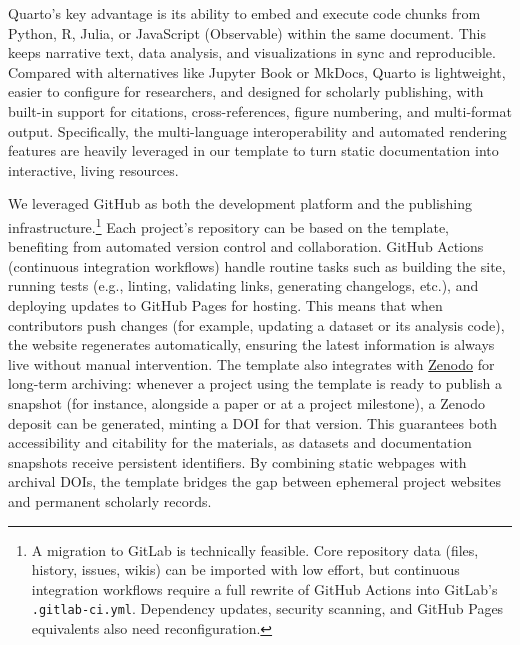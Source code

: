 \documentclass[final]{anthology-ch} %
\begin{document}
Quarto's key advantage is its ability to embed and execute code chunks from Python, R, Julia, or JavaScript (Observable) within the same document. This keeps narrative text, data analysis, and visualizations in sync and reproducible. Compared with alternatives like Jupyter Book or MkDocs, Quarto is lightweight, easier to configure for researchers, and designed for scholarly publishing, with built-in support for citations, cross-references, figure numbering, and multi-format output. Specifically, the multi-language interoperability and automated rendering features are heavily leveraged in our template to turn static documentation into interactive, living resources.

We leveraged GitHub as both the development platform and the publishing infrastructure.\footnote{A migration to GitLab is technically feasible. Core repository data (files, history, issues, wikis) can be imported with low effort, but continuous integration workflows require a full rewrite of GitHub Actions into GitLab's \texttt{.gitlab-ci.yml}. Dependency updates, security scanning, and GitHub Pages equivalents also need reconfiguration.} Each project's repository can be based on the template, benefiting from automated version control and collaboration. GitHub Actions (continuous integration workflows) handle routine tasks such as building the site, running tests (e.g., linting, validating links, generating changelogs, etc.), and deploying updates to GitHub Pages for hosting. This means that when contributors push changes (for example, updating a dataset or its analysis code), the website regenerates automatically, ensuring the latest information is always live without manual intervention. The template also integrates with \href{https://zenodo.org/}{Zenodo} for long-term archiving: whenever a project using the template is ready to publish a snapshot (for instance, alongside a paper or at a project milestone), a Zenodo deposit can be generated, minting a DOI for that version. This guarantees both accessibility and citability for the materials, as datasets and documentation snapshots receive persistent identifiers. By combining static webpages with archival DOIs, the template bridges the gap between ephemeral project websites and permanent scholarly records.
\end{document}
